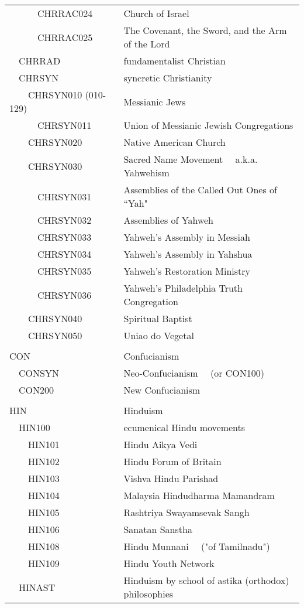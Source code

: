 \documentclass[12pt]{article}
\begin{document}
\begin{tiny}
\begin{center}
\begin{longtable}{|l|l|}
~~~~~~CHRRAC024 & Church of Israel \\
~~~~~~CHRRAC025 & The Covenant, the Sword, and the Arm of the Lord \\
~~CHRRAD & fundamentalist Christian \\
~~CHRSYN & syncretic Christianity \\
~~~~CHRSYN010 (010-129) & Messianic Jews \\
~~~~~~CHRSYN011 & Union of Messianic Jewish Congregations \\
~~~~CHRSYN020 & Native American Church \\
~~~~CHRSYN030 & Sacred Name Movement	~~a.k.a. Yahwehism \\
~~~~~~CHRSYN031 & Assemblies of the Called Out Ones of “Yah" \\
~~~~~~CHRSYN032 & Assemblies of Yahweh \\
~~~~~~CHRSYN033 & Yahweh’s Assembly in Messiah \\
~~~~~~CHRSYN034 & Yahweh's Assembly in Yahshua \\
~~~~~~CHRSYN035 & Yahweh's Restoration Ministry \\
~~~~~~CHRSYN036 & Yahweh's Philadelphia Truth Congregation \\
~~~~CHRSYN040 & Spiritual Baptist \\
~~~~CHRSYN050 & Uniao do Vegetal \\
 \\
{\normalsize CON } & {\normalsize Confucianism } \\
~~CONSYN & Neo-Confucianism	~~(or CON100) \\
~~CON200 & New Confucianism \\
 \\
{\normalsize HIN } & {\normalsize Hinduism } \\
~~HIN100 & ecumenical Hindu movements \\
~~~~HIN101 & Hindu Aikya Vedi \\
~~~~HIN102 & Hindu Forum of Britain \\
~~~~HIN103 & Vishva Hindu Parishad \\
~~~~HIN104 & Malaysia Hindudharma Mamandram \\
~~~~HIN105 & Rashtriya Swayamsevak Sangh \\
~~~~HIN106 & Sanatan Sanstha \\
~~~~HIN108 & Hindu Munnani	~~("of Tamilnadu") \\
~~~~HIN109 & Hindu Youth Network \\
~~HINAST & Hinduism by school of astika (orthodox) philosophies \\

\end{longtable}
\end{center}
\end{tiny}
\end{document}
